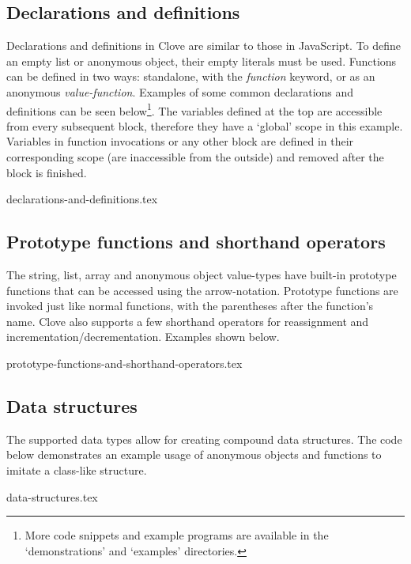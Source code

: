 \documentclass[12pt,a4paper]{article}
\begin{document}
\vspace{-0.25em}
\subsection*{Declarations and definitions}
Declarations and definitions in Clove are similar to those in JavaScript. To define an empty list or anonymous object, their empty literals must be used. Functions can be defined in two ways: standalone, with the \emph{function} keyword, or as an anonymous \emph{value-function}. Examples of some common declarations and definitions can be seen below\footnote{More code snippets and example programs are available in the `demonstrations' and `examples' directories.}. The variables defined at the top are accessible from every subsequent block, therefore they have a `global' scope in this example. Variables in function invocations or any other block are defined in their corresponding scope (are inaccessible from the outside) and removed after the block is finished.

{declarations-and-definitions.tex}



\subsection*{Prototype functions and shorthand operators}
The string, list, array and anonymous object value-types have built-in prototype functions that can be accessed using the arrow-notation. Prototype functions are invoked just like normal functions, with the parentheses after the function's name. Clove also supports a few shorthand operators for reassignment and incrementation/decrementation. Examples shown below.

{prototype-functions-and-shorthand-operators.tex}



\vspace{-1.5em}
\subsection*{Data structures}
The supported data types allow for creating compound data structures. The code below demonstrates an example usage of anonymous objects and functions to imitate a class-like structure.

{data-structures.tex}
\end{document}
